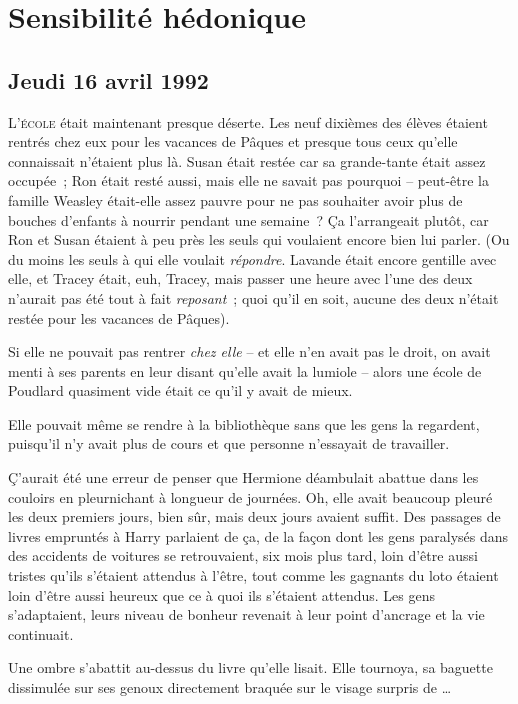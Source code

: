 \chapter{Sensibilité hédonique}

\section{Jeudi 16 avril 1992}

\lettrine{L}{'école}  était maintenant presque déserte. Les neuf dixièmes des élèves étaient rentrés chez eux pour les vacances de Pâques et presque tous ceux qu'elle connaissait n'étaient plus là. Susan était restée car sa grande-tante était assez occupée~; Ron était resté aussi, mais elle ne savait pas pourquoi -- peut-être la famille Weasley était-elle assez pauvre pour ne pas souhaiter avoir plus de bouches d'enfants à nourrir pendant une semaine~? Ça l'arrangeait plutôt, car Ron et Susan étaient à peu près les seuls qui voulaient encore bien lui parler. (Ou du moins les seuls à qui elle voulait \emph{répondre}. Lavande était encore gentille avec elle, et Tracey était, euh, Tracey, mais passer une heure avec l'une des deux n'aurait pas été tout à fait \emph{reposant}~; quoi qu'il en soit, aucune des deux n'était restée pour les vacances de Pâques).

Si elle ne pouvait pas rentrer \emph{chez elle} -- et elle n'en avait pas le droit, on avait menti à ses parents en leur disant qu'elle avait la lumiole -- alors une école de Poudlard quasiment vide était ce qu'il y avait de mieux.

Elle pouvait même se rendre à la bibliothèque sans que les gens la regardent, puisqu'il n'y avait plus de cours et que personne n'essayait de travailler.

Ç'aurait été une erreur de penser que Hermione déambulait abattue dans les couloirs en pleurnichant à longueur de journées. Oh, elle avait beaucoup pleuré les deux premiers jours, bien sûr, mais deux jours avaient suffit. Des passages de livres empruntés à Harry parlaient de ça, de la façon dont les gens paralysés dans des accidents de voitures se retrouvaient, six mois plus tard, loin d'être aussi tristes qu'ils s'étaient attendus à l'être, tout comme les gagnants du loto étaient loin d'être aussi heureux que ce à quoi ils s'étaient attendus. Les gens s'adaptaient, leurs niveau de bonheur revenait à leur point d'ancrage et la vie continuait.

Une ombre s'abattit au-dessus du livre qu'elle lisait. Elle tournoya, sa baguette dissimulée sur ses genoux directement braquée sur le visage surpris de …

